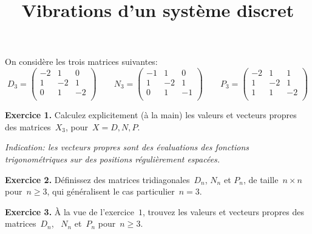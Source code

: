 %
%
%
%
%
\title{Vibrations d'un système discret}

On considère les trois matrices suivantes:
\[
	D_3=\begin{pmatrix}
		-2 & 1 & 0 \\
		1 & -2 & 1 \\
		0 & 1 & -2 \\
	\end{pmatrix}
	\qquad
	N_3=\begin{pmatrix}
		-1 & 1 & 0 \\
		1 & -2 & 1 \\
		0 & 1 & -1 \\
	\end{pmatrix}
	\qquad
	P_3=\begin{pmatrix}
		-2 & 1 & 1 \\
		1 & -2 & 1 \\
		1 & 1 & -2 \\
	\end{pmatrix}
\]

{\bf Exercice 1.}
Calculez explicitement (à la main) les valeurs et vecteurs propres des
matrices~$X_3$, pour~$X=D,N,P$.

{\sl Indication: les vecteurs propres sont des évaluations des fonctions
trigonométriques sur des positions régulièrement espacées.}

{\bf Exercice 2.}
Définissez des matrices tridiagonales~$D_n$, $N_n$ et $P_n$, de taille~$n\times
n$ pour~$n\ge 3$, qui généralisent le cas particulier~$n=3$.

{\bf Exercice 3.}
À la vue de l'exercice~$1$, trouvez les valeurs et vecteurs propres des
matrices~$D_n$, ~$N_n$ et~$P_n$ pour~$n\ge 3$.

